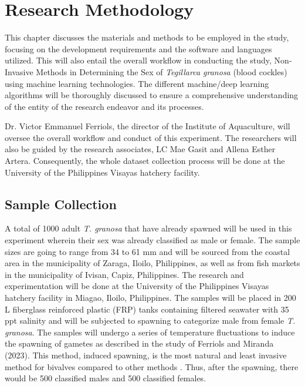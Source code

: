 \chapter{Research Methodology}
\label{sec:methodology}

This chapter discusses the materials and methods to be employed in the study, focusing on the development requirements and the software and languages utilized. This will also entail the overall workflow in conducting the study, Non-Invasive Methods in Determining the Sex of \textit{Tegillarca granosa} (blood cockles) using machine learning technologies. The different machine/deep learning algorithms will be thoroughly discussed to ensure a comprehensive understanding of the entity of the research endeavor and its processes. 

Dr. Victor Emmanuel Ferriols, the director of the Institute of Aquaculture, will oversee the overall workflow and conduct of this experiment. The researchers will also be guided by the research associates, LC Mae Gasit and Allena Esther Artera. Consequently, the whole dataset collection process will be done at the University of the Philippines Visayas hatchery facility. 



\section{Sample Collection}
\label{sec:samplecollect}
A total of 1000 adult \textit{T. granosa} that have already spawned will be used in this experiment wherein their sex was already classified as male or female. The sample sizes are going to range from 34 to 61 mm and will be sourced from the coastal area in the municipality of Zaraga, Iloilo, Philippines, as well as from fish markets in the municipality of Ivisan, Capiz, Philippines. The research and experimentation will be done at the University of the Philippines Visayas hatchery facility in Miagao, Iloilo, Philippines. The samples will be placed in 200 L fiberglass reinforced plastic (FRP) tanks containing filtered seawater with 35 ppt salinity \cite{miranda2023} and will be subjected to spawning to categorize male from female \textit{T. granosa}. The samples will undergo a series of temperature fluctuations to induce the spawning of gametes as described in the study of Ferriols and Miranda (2023). This method, induced spawning, is the most natural and least invasive method for bivalves compared to other methods \cite{aji}. Thus, after the spawning, there would be 500 classified males and 500 classified females. 

